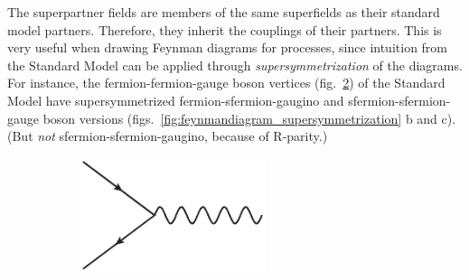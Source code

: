 \documentclass[twoside,english]{uiofysmaster}
\begin{document}
 The superpartner fields are members of the same superfields as their standard model partners. Therefore, they inherit the couplings of their partners. This is very useful when drawing Feynman diagrams for processes, since intuition from the Standard Model can be applied through {\it supersymmetrization} of the diagrams. For instance, the fermion-fermion-gauge boson vertices (fig.\ \ref{fig:feynmandiagram_supersymmetrization_a}) of the Standard Model have supersymmetrized fermion-sfermion-gaugino and sfermion-sfermion-gauge boson versions (figs.\ \ref{fig:feynmandiagram_supersymmetrization} b and c). (But {\it not} sfermion-sfermion-gaugino, because of R-parity.) 
 \begin{figure}[htbp]
	\centering
	\begin{subfigure}[b]{0.45\textwidth}
		\centering
		\includegraphics[width=0.6\textwidth]{figures/susyintro/ffg_vertex.eps}
		\caption{ }
		\label{fig:feynmandiagram_supersymmetrization_a}
	\end{subfigure}


\end{figure}
\end{document}

